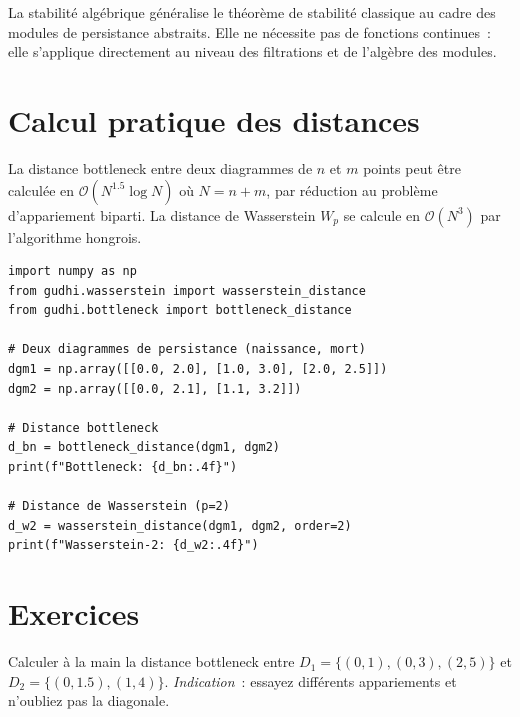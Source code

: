 \begin{remarque}
La stabilit\'e alg\'ebrique g\'en\'eralise le th\'eor\`eme de stabilit\'e
classique au cadre des modules de persistance abstraits. Elle ne
n\'ecessite pas de fonctions continues~: elle s'applique directement
au niveau des filtrations et de l'alg\`ebre des modules.
\end{remarque}

\section{Calcul pratique des distances}
\label{sec:calcul}

\begin{proposition}[Complexit\'e]
La distance bottleneck entre deux diagrammes de $n$ et $m$ points
peut \^etre calcul\'ee en $\mathcal{O}(N^{1.5} \log N)$ o\`u
$N = n + m$, par r\'eduction au probl\`eme d'appariement biparti.
La distance de Wasserstein $W_p$ se calcule en $\mathcal{O}(N^3)$
par l'algorithme hongrois.
\end{proposition}

\begin{verbatim}
import numpy as np
from gudhi.wasserstein import wasserstein_distance
from gudhi.bottleneck import bottleneck_distance

# Deux diagrammes de persistance (naissance, mort)
dgm1 = np.array([[0.0, 2.0], [1.0, 3.0], [2.0, 2.5]])
dgm2 = np.array([[0.0, 2.1], [1.1, 3.2]])

# Distance bottleneck
d_bn = bottleneck_distance(dgm1, dgm2)
print(f"Bottleneck: {d_bn:.4f}")

# Distance de Wasserstein (p=2)
d_w2 = wasserstein_distance(dgm1, dgm2, order=2)
print(f"Wasserstein-2: {d_w2:.4f}")
\end{verbatim}

\section{Exercices}

\begin{exercice}
Calculer \`a la main la distance bottleneck entre
$D_1 = \{(0,1), (0,3), (2,5)\}$ et
$D_2 = \{(0,1.5), (1,4)\}$.
\textit{Indication}~: essayez diff\'erents appariements et n'oubliez
pas la diagonale.
\end{exercice}

